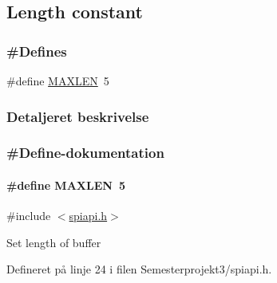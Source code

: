 \hypertarget{group___m_a_x_l_e_n}{}\subsection{Length constant}
\label{group___m_a_x_l_e_n}
\subsubsection*{\#Defines}
\begin{DoxyCompactItemize}
\item 
\#define \hyperlink{group___m_a_x_l_e_n_gae6648cd71a8bd49d58ae8ed33ba910d1}{M\+A\+X\+L\+EN}~5
\end{DoxyCompactItemize}


\subsubsection{Detaljeret beskrivelse}


\subsubsection{\#Define-\/dokumentation}
\paragraph[{\texorpdfstring{M\+A\+X\+L\+EN}{MAXLEN}}]{\setlength{\rightskip}{0pt plus 5cm}\#define M\+A\+X\+L\+EN~5}\hypertarget{group___m_a_x_l_e_n_gae6648cd71a8bd49d58ae8ed33ba910d1}{}\label{group___m_a_x_l_e_n_gae6648cd71a8bd49d58ae8ed33ba910d1}


{\ttfamily \#include $<$\hyperlink{_semesterprojekt3_2spiapi_8h}{spiapi.\+h}$>$}

Set length of buffer 

Defineret på linje 24 i filen Semesterprojekt3/spiapi.\+h.

